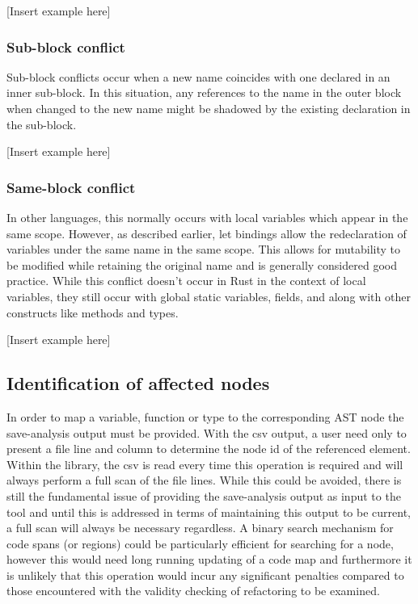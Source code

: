 [Insert example here]

\subsubsection{Sub-block conflict}
Sub-block conflicts occur when a new name coincides with one declared in an inner sub-block. In this situation, any references to the name in the outer block when changed to the new name might be shadowed by the existing declaration in the sub-block.

[Insert example here]

\subsubsection{Same-block conflict}
In other languages, this normally occurs with local variables which appear in the same scope. However, as described earlier, let bindings allow the redeclaration of variables under the same name in the same scope. This allows for mutability to be modified while retaining the original name and is generally considered good practice. While this conflict doesn't occur in Rust in the context of local variables, they still occur with global static variables, fields, and along with other constructs like methods and types.

[Insert example here]

\subsection{Identification of affected nodes}
In order to map a variable, function or type to the corresponding AST node the save-analysis output must be provided. With the csv output, a user need only to present a file line and column to determine the node id of the referenced element. Within the library, the csv is read every time this operation is required and will always perform a full scan of the file lines. While this could be avoided, there is still the fundamental issue of providing the save-analysis output as input to the tool and until this is addressed in terms of maintaining this output to be current, a full scan will always be necessary regardless. A binary search mechanism for code spans (or regions) could be particularly efficient for searching for a node, however this would need long running updating of a code map and furthermore it is unlikely that this operation would incur any significant penalties compared to those encountered with the validity checking of refactoring to be examined.

